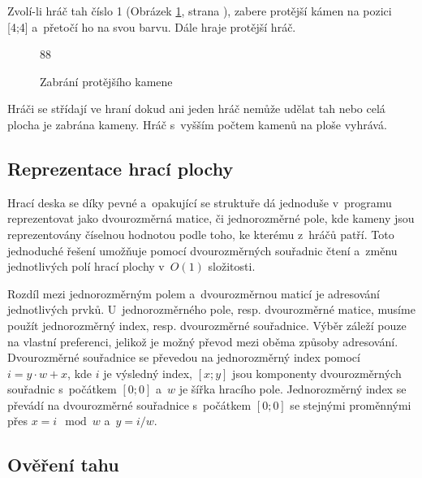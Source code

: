 Zvolí-li hráč tah číslo 1 (Obrázek \ref{img:board_capture}, strana \pageref{img:board_capture}), zabere protější kámen na pozici [4;4] a~přetočí ho na svou barvu. Dále hraje protější hráč.

\begin{figure}[h]
	\centering

	\begin{othellogame}{8}{8}
		
	\end{othellogame}

	\caption{Zabrání protějšího kamene}
	\label{img:board_capture}
\end{figure}

Hráči se střídají ve hraní dokud ani jeden hráč nemůže udělat tah nebo celá plocha je zabrána kameny. Hráč s~vyšším počtem kamenů na ploše vyhrává.

\subsection{Reprezentace hrací plochy}

Hrací deska se díky pevné a~opakující se struktuře dá jednoduše v~programu reprezentovat jako dvourozměrná matice, či jednorozměrné pole, kde kameny jsou reprezentovány číselnou hodnotou podle toho, ke kterému z~hráčů patří. Toto jednoduché řešení umožňuje pomocí dvourozměrných souřadnic čtení a~změnu jednotlivých polí hrací plochy v~$O(1)$ složitosti.

Rozdíl mezi jednorozměrným polem a~dvourozměrnou maticí je adresování jednotlivých prvků. U~jednorozměrného pole, resp. dvourozměrné matice, musíme použít jednorozměrný index, resp. dvourozměrné souřadnice. Výběr záleží pouze na vlastní preferenci, jelikož je možný převod mezi oběma způsoby adresování. Dvourozměrné souřadnice se převedou na jednorozměrný index pomocí $i=y\cdot w+x$, kde $i$ je výsledný index, $[x;y]$ jsou komponenty dvourozměrných souřadnic s~počátkem $[0;0]$ a~$w$ je šířka hracího pole. Jednorozměrný index se převádí na dvourozměrné souřadnice s~počátkem $[0;0]$ se stejnými proměnnými přes $x=i\mod w$ a~$y=i/w$.

\subsection{Ověření tahu} \label{sec:turncheck}

